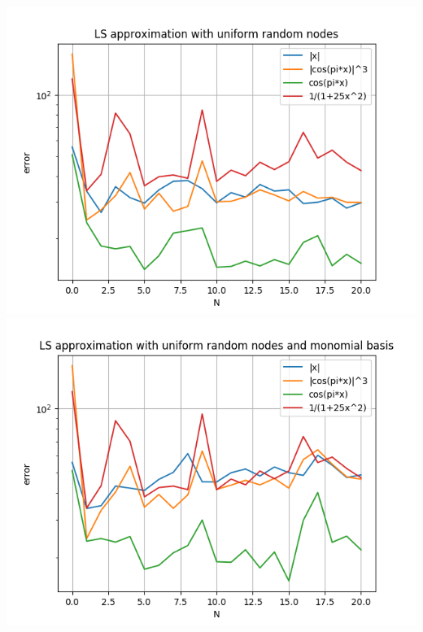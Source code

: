 \documentclass{article}
\begin{document}
\includegraphics[scale=0.8]{4.png}
\includegraphics[scale=0.8]{5.png}
\end{document}
